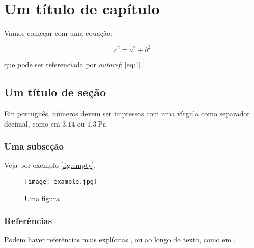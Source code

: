 \documentclass[a4,brazil]{brthesis}
\begin{document}
\renewcommand{\nomname}{\listadesimbolosname}
\pdfbookmark[0]{\nomname}{las}
\printnomenclature
\cleardoublepage

\tableofcontents*
\cleardoublepage

\textual

\chapter{Um título de capítulo}
\label{cha:chapter-title}

Vamos começar com uma equação:

\begin{equation}
  \label{eq:1}
  c^2 = a^2 + b^2
\end{equation}

\noindent que pode ser referenciada por \textsl{autoref}: \autoref{eq:1}.

\section{Um título de seção}
\label{sec:section-title}

Em português, números devem ser impressos com uma vírgula como separador decimal, como em $\num{3.14}$ ou $\SI{1.3}{\pascal}$

\subsection{Uma subseção}
\label{sec:subsection}

Veja por exemplo \autoref{fig:empty}.

\begin{figure}[!ht]
  \centering
  \texttt{[image: example.jpg]}
  \caption{Uma figura}
  \label{fig:empty}
\end{figure}


\subsection{Referências}
\label{sec:referencias}

Podem haver referências mais explícitas \cite{bib:furlani}, ou ao longo do texto, como em .

\postextual


\end{document}

